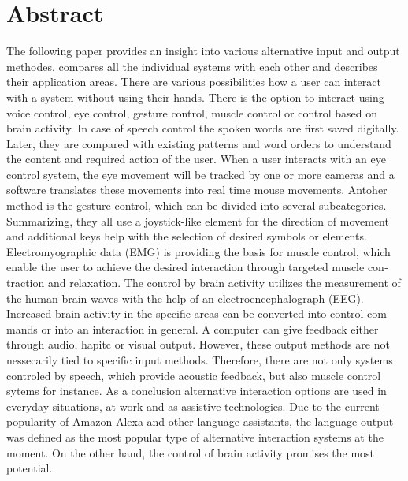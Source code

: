 \chapter{Abstract}

\begin{english} %
The following paper provides an insight into various alternative input and output methodes, compares all the individual systems with each other and describes their application areas.
\newline \newline
There are various possibilities how a user can interact with a system without using their hands. There is the option to interact using voice control, eye control, gesture control, muscle control or control based on brain activity. In case of speech control the spoken words are first saved digitally. Later, they are compared with existing patterns and word orders to understand the content and required action of the user. When a user interacts with an eye control system, the eye movement will be tracked by one or more cameras and a software translates these movements into real time mouse movements. Antoher method is the gesture control, which can be divided into several subcategories. Summarizing, they all use a joystick-like element for the direction of movement and additional keys help with the selection of desired symbols or elements. Electromyographic data (EMG) is providing the basis for muscle control, which enable the user to achieve the desired interaction through targeted muscle contraction and relaxation. The control by brain activity utilizes the measurement of the human brain waves with the help of an electroencephalograph (EEG). Increased brain activity in the specific areas can be converted into control commands or into an interaction in general.
\newline \newline
A computer can give feedback either through audio, hapitc or visual output. However, these output methods are not nessecarily tied to specific input methods. Therefore, there are not only systems controled by speech, which provide acoustic feedback, but also muscle control sytems for instance.
\newline \newline
As a conclusion alternative interaction options are used in everyday situations, at work and as assistive technologies. Due to the current popularity of Amazon Alexa and other language assistants, the language output was defined as the most popular type of alternative interaction systems at the moment. On the other hand, the control of brain activity promises the most potential.
\end{english}



